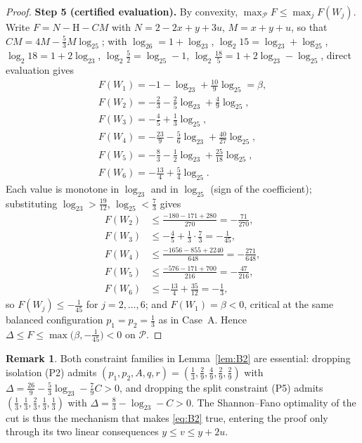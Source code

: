 \documentclass[journal]{IEEEtran}
\theoremstyle{definition}
\newtheorem{remark}{Remark}
\newcommand{\lgg}{\log_2}
\newcommand{\CC}{C}
\newcommand{\cP}{\mathcal{P}}
\begin{document}
\begin{proof}
\textbf{Step 5 (certified evaluation).} By convexity,
$\max_\cP F\le\max_jF(W_j)$. Write $F=N-\mathrm H-\CC M$ with $N=2-2x+y+3u$,
$M=x+y+u$, so that $\CC M=4M-\tfrac53M\lgg5$; with
$\lgg6=1+\lgg3$, $\lgg{15}=\lgg3+\lgg5$, $\lgg{18}=1+2\lgg3$,
$\lgg\tfrac52=\lgg5-1$, $\lgg\tfrac{18}5=1+2\lgg3-\lgg5$, direct evaluation
gives
\[
\begin{array}{l}
F(W_1)=-1-\lgg3+\tfrac{10}9\lgg5=\beta,\\[3pt]
F(W_2)=-\tfrac23-\tfrac25\lgg3+\tfrac49\lgg5,\\[3pt]
F(W_3)=-\tfrac45+\tfrac13\lgg5,\\[3pt]
F(W_4)=-\tfrac{23}9-\tfrac56\lgg3+\tfrac{40}{27}\lgg5,\\[3pt]
F(W_5)=-\tfrac83-\tfrac12\lgg3+\tfrac{25}{18}\lgg5,\\[3pt]
F(W_6)=-\tfrac{13}4+\tfrac54\lgg5 .
\end{array}
\]
Each value is monotone in $\lgg3$ and in $\lgg5$ (sign of the coefficient);
substituting $\lgg3>\tfrac{19}{12}$, $\lgg5<\tfrac73$ gives
\begin{align*}
  F(W_2)&\le\tfrac{-180-171+280}{270}=-\tfrac{71}{270},\\
  F(W_3)&\le-\tfrac45+\tfrac13\cdot\tfrac73=-\tfrac1{45},\\
  F(W_4)&\le\tfrac{-1656-855+2240}{648}=-\tfrac{271}{648},\\
  F(W_5)&\le\tfrac{-576-171+700}{216}=-\tfrac{47}{216},\\
  F(W_6)&\le-\tfrac{13}4+\tfrac{35}{12}=-\tfrac13,
\end{align*}
so $F(W_j)\le-\tfrac1{45}$ for $j=2,\dots,6$; and $F(W_1)=\beta<0$, critical at the same
balanced configuration $p_1=p_2=\tfrac13$ as in Case~A. Hence
$\Delta\le F\le\max\bigl(\beta,-\tfrac1{45}\bigr)<0$ on $\cP$.
\end{proof}

\begin{remark}
Both constraint families in Lemma~\ref{lem:B2} are essential: dropping
isolation (P2) admits
$(p_1,p_2,A,q,r)=(\tfrac13,\tfrac29,\tfrac49,\tfrac29,\tfrac29)$ with
$\Delta=\tfrac{26}9-\tfrac53\lgg3-\tfrac79\CC>0$, and dropping
the split constraint
(P5) admits $(\tfrac13,\tfrac13,\tfrac23,\tfrac13,\tfrac13)$ with
$\Delta=\tfrac83-\lgg3-\CC>0$.
The Shannon--Fano optimality of the cut is thus the
mechanism that makes \eqref{eq:B2} true, entering the proof only through its
two linear consequences $y\le v\le y+2u$.
\end{remark}
\end{document}
